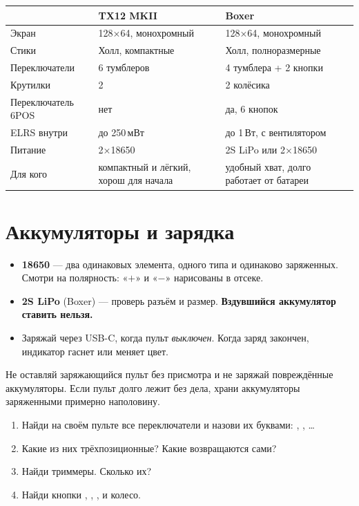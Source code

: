 \begin{center}\small
\renewcommand{\arraystretch}{1.25}
\begin{tabularx}{\linewidth}{@{}L{35mm}YY@{}}
\toprule
& \textbf{TX12 MKII} & \textbf{Boxer} \\
\midrule
Экран & 128×64, монохромный & 128×64, монохромный \\
Стики & Холл, компактные & Холл, полноразмерные \\
Переключатели & 6 тумблеров & 4 тумблера + 2 кнопки \\
Крутилки & 2 & 2 колёсика \\
Переключатель 6POS & нет & да, 6 кнопок \\
ELRS внутри & до 250\,мВт & до 1\,Вт, с вентилятором \\
Питание & 2×18650 & 2S LiPo или 2×18650 \\
Для кого & компактный и лёгкий, хорош для начала & удобный хват, долго работает от батареи \\
\bottomrule
\end{tabularx}
\end{center}

\section{Аккумуляторы и зарядка}

\begin{itemize}
  \item \textbf{18650} --- два одинаковых элемента, одного типа и одинаково заряженных.
        Смотри на полярность: «$+$» и «$-$» нарисованы в отсеке.
  \item \textbf{2S LiPo} (Boxer) --- проверь разъём и размер. \textbf{Вздувшийся аккумулятор
        ставить нельзя.}
  \item Заряжай через USB-C, когда пульт \emph{выключен}. Когда заряд закончен, индикатор
        гаснет или меняет цвет.
\end{itemize}

\begin{caution}
Не оставляй заряжающийся пульт без присмотра и не заряжай повреждённые аккумуляторы.
Если пульт долго лежит без дела, храни аккумуляторы заряженными примерно наполовину.
\end{caution}

\begin{tryit}
\begin{enumerate}
  \item Найди на своём пульте все переключатели и назови их буквами: , , …
  \item Какие из них трёхпозиционные? Какие возвращаются сами?
  \item Найди триммеры. Сколько их?
  \item Найди кнопки , , ,  и колесо.
\end{enumerate}
\end{tryit}

